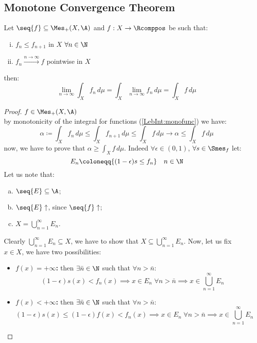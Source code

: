 \subsection{Monotone Convergence Theorem}\label{MCT}
Let $\seq{f} \subseteq \Mes_+(X,\A)$ and $f:X\to\Rcomppos$ be such that:
\begin{enumerate}[i)]
    \item $f_n \leq f_{n+1}$ in $X$ $\forall n\in\N$
    \item $f_n \xrightarrow{n\to\infty} f$ pointwise in $X$
\end{enumerate}
then:
\[
    \lim_{n\to\infty} \int_X f_n \, d\mu = \int_X \lim_{n\to\infty} f_n \, d\mu =\int_X f \, d\mu    
\]

\begin{proof}
    $f\in\Mes_+(X,\A)$ \\
    by monotonicity of the integral for functions (\ref{LebInt:monofunc}) we have:
    \[
        \alpha \coloneqq \int_X f_n \, d\mu \leq \int_X f_{n+1} \, d\mu \leq \int_X f \, d\mu  \longrightarrow \alpha \leq \int_X f \, d\mu
    \]
    now, we have to prove that $\alpha \geq \int_X f \, d\mu$. Indeed $\forall \epsilon \in (0,1)$, $\forall s \in \Smes_f$ let:
    \[
        E_n \coloneqq \{ (1-\epsilon) s \leq f_n \} \quad n\in\N    
    \]
    Let us note that:
    \begin{enumerate}[a)]
        \item $\seq{E} \subseteq \A$;
        \item $\seq{E} \uparrow$, since $\seq{f} \uparrow$;
        \item $X=\bigcup_{n=1}^\infty E_n$.
    \end{enumerate}
    Clearly $\bigcup_{n=1}^\infty E_n \subseteq X$, we have to show that $X \subseteq \bigcup_{n=1}^\infty E_n$. Now, let us fix $x\in X$, we have two possibilities:
    \begin{itemize}
        \item \textbf{$f(x)=+\infty$:} then $\exists \bar{n}\in\N$ such that $\forall n> \bar{n}$:
            \[
                (1-\epsilon) s(x) < f_n(x) \implies x\in E_n \; \forall n > \bar{n} \implies x \in \bigcup_{n=1}^\infty E_n
            \]
        \item \textbf{$f(x)<+\infty$:} then $\exists \bar{n}\in\N$ such that $\forall n> \bar{n}$:
            \[
                (1-\epsilon) s(x) \leq (1-\epsilon) f(x) < f_n(x) \implies x\in E_n \; \forall n > \bar{n} \implies x \in \bigcup_{n=1}^\infty E_n
            \]
    \end{itemize}

\end{proof}
